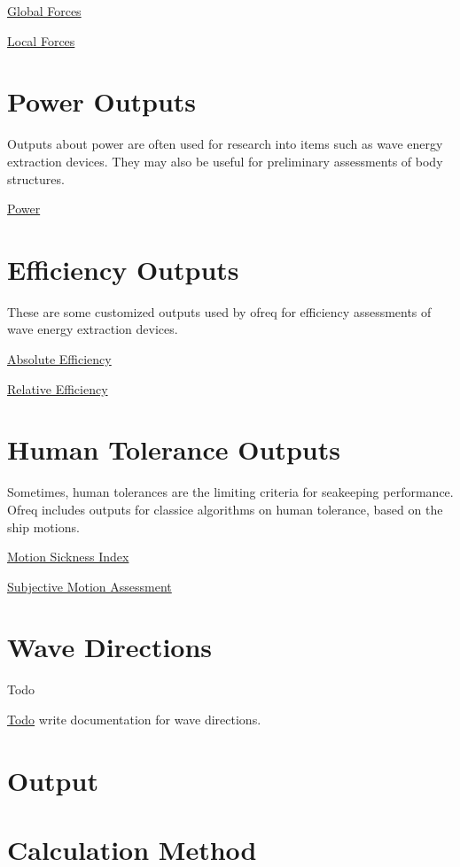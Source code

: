 \hyperlink{global_force}{Global Forces}

\hyperlink{local_force}{Local Forces}

\section*{Power Outputs}

Outputs about power are often used for research into items such as wave energy extraction devices. They may also be useful for preliminary assessments of body structures.

\hyperlink{power}{Power}

\section*{Efficiency Outputs}

These are some customized outputs used by ofreq for efficiency assessments of wave energy extraction devices.

\hyperlink{efficiency_absolute}{Absolute Efficiency}

\hyperlink{efficiency_relative}{Relative Efficiency}

\section*{Human Tolerance Outputs}

Sometimes, human tolerances are the limiting criteria for seakeeping performance. Ofreq includes outputs for classice algorithms on human tolerance, based on the ship motions.

\hyperlink{local_msi}{Motion Sickness Index}

\hyperlink{local_sma}{Subjective Motion Assessment} \hypertarget{wave_directions}{}\section{Wave Directions}\label{wave_directions}
\begin{DoxyRefDesc}{Todo}
\item[\hyperlink{todo__todo000031}{Todo}]write documentation for wave directions. \end{DoxyRefDesc}


\section*{Output}

\section*{Calculation Method}

